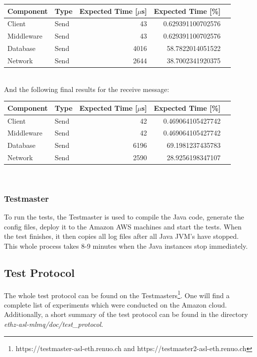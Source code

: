 \documentclass[milestone1.tex]{subfiles}
\begin{document}
\begin{tabular}{|l|l|r|r|r|}
\hline
Component & Type & Expected Time [$\mu$s] & Expected Time [\%] \\ \hline
Client & Send & 43 & 0.629391100702576 \\ \hline
Middleware & Send & 43 & 0.629391100702576 \\ \hline
Database & Send & 4016 & 58.7822014051522 \\ \hline
Network & Send & 2644 & 38.7002341920375 \\ \hline
\end{tabular}
\\

\noindent And the following final results for the receive message:\\

\begin{tabular}{|l|l|r|r|r|}
\hline
Component & Type & Expected Time [$\mu$s] & Expected Time [\%] \\ \hline
Client & Send & 42 & 0.469064105427742 \\ \hline
Middleware & Send & 42 & 0.469064105427742 \\ \hline
Database & Send & 6196 & 69.1981237435783 \\ \hline
Network & Send & 2590 & 28.9256198347107 \\ \hline
\end{tabular}
\\


\subsubsection{Testmaster}

To run the tests, the Testmaster is used to compile the Java code, generate the config files, deploy it to the Amazon AWS machines and start the tests. When the test finishes, it then copies all log files after all Java JVM's have stopped. This whole process takes 8-9 minutes when the Java instances stop immediately.


\subsection{Test Protocol}

The whole test protocol can be found on the Testmasters\footnote{https://testmaster-asl-eth.renuo.ch and https://testmaster2-asl-eth.renuo.ch}. One will find a complete list of experiments which were conducted on the Amazon cloud. Additionally, a short summary of the test protocol can be found in the directory \textit{ethz-asl-mlmq/doc/test\_protocol}.
\end{document}
